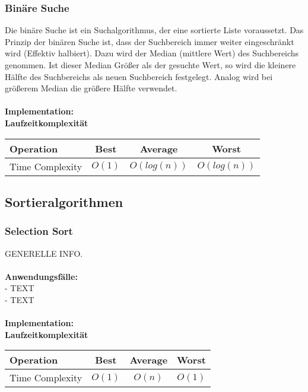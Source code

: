 \documentclass[../main.tex]{subfiles}
\begin{document}
	\subsubsection{Binäre Suche}
	Die binäre Suche ist ein Suchalgorithmus, der eine sortierte Liste voraussetzt.
	Das Prinzip der binären Suche ist, dass der Suchbereich immer weiter eingeschränkt wird (Effektiv halbiert). 
	Dazu wird der Median (mittlere Wert) des Suchbereichs genommen. 
	Ist dieser Median Größer als der gesuchte Wert, so wird die kleinere Hälfte des Suchbereichs als neuen Suchbereich festgelegt.
	Analog wird bei größerem Median die größere Hälfte verwendet.\\\\
	\textbf{Implementation:}\\
	 
	\textbf{Laufzeitkomplexität}\\
	\begin{table}[ht]
		\centering
		\begin{tabular}{l *{3}{c}}
			\toprule
			Operation & Best & Average & Worst\\
			\midrule
			Time Complexity & $O(1)$ & $O(log(n))$ & $O(log(n))$\\
			\bottomrule
		\end{tabular}
	\end{table}
	\clearpage

	\subsection{Sortieralgorithmen}
	\subsubsection{Selection Sort}
	GENERELLE INFO. \\\\
	\textbf{Anwendungsfälle:}\\
	- TEXT\\
	- TEXT\\\\
	\textbf{Implementation:}\\
	 
	\textbf{Laufzeitkomplexität}\\
	\begin{table}[ht]
		\centering
		\begin{tabular}{l *{3}{c}}
			\toprule
			Operation & Best & Average & Worst\\
			\midrule
			Time Complexity & $O(1)$ & $O(n)$ & $O(1)$\\
			\bottomrule
		\end{tabular}
	\end{table}
	\clearpage
	
\end{document}

